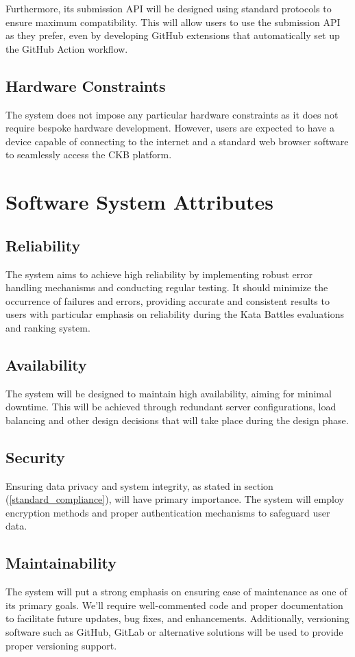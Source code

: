 \documentclass[11pt]{report}
\begin{document}
Furthermore, its submission API will be designed using standard protocols to ensure maximum compatibility.
This will allow users to use the submission API as they prefer,
even by developing GitHub extensions that automatically set up the GitHub Action workflow.


\subsection{Hardware Constraints}
The system does not impose any particular hardware constraints as it does not require bespoke hardware development.
However, users are expected to have a device capable of connecting to the internet and a standard web browser software to seamlessly access the CKB platform.

\section{Software System Attributes}

\subsection{Reliability}
The system aims to achieve high reliability by implementing robust error handling mechanisms and conducting regular testing.
It should minimize the occurrence of failures and errors, providing accurate and consistent results to users with particular emphasis on reliability during the Kata Battles evaluations and ranking system.

\subsection{Availability}
The system will be designed to maintain high availability, aiming for minimal downtime.
This will be achieved through redundant server configurations, load balancing and other design decisions that will take place during the design phase.

\subsection{Security}
Ensuring data privacy and system integrity, as stated in section (\ref{standard_compliance}), will have primary importance.
The system will employ encryption methods and proper authentication mechanisms to safeguard user data.

\subsection{Maintainability}
The system will put a strong emphasis on ensuring ease of maintenance as one of its primary goals.
We'll require well-commented code and proper documentation to facilitate future updates, bug fixes, and enhancements.
Additionally, versioning software such as GitHub, GitLab or alternative solutions will be used to provide proper versioning support.
\end{document}
